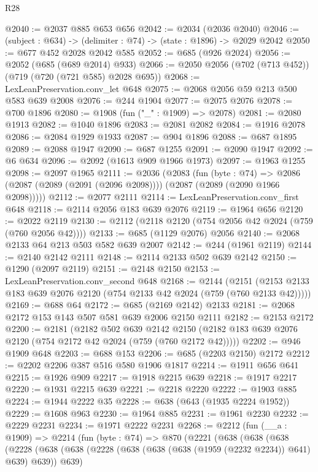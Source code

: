 \begin{lexlean}{R28}
\begin{coremodule}
@2040 := @2037 @885 @653 @656
@2042 := @2034 (@2036 @2040)
@2046 := (subject : @634) -> (delimiter : @74) -> (state : @1896) -> @2029 @2042
@2050 := @677 @452 @2028 @2042 @585
@2052 := @685 (@926 @2024)
@2056 := @2052 (@685 (@689 @2014) @933)
@2066 := @2050 @2056 (@702 (@713 @452)) (@719 (@720 (@721 @585) @2028 @695))
@2068 := LexLeanPreservation.conv_let @648
@2075 := @2068 @2056 @59 @213 @500 @583 @639 @2008
@2076 := @244 @1904
@2077 := @2075 @2076
@2078 := @700 @1896
@2080 := @1908 (fun ("_" : @1909) => @2078)
@2081 := @2080 @1913
@2082 := @1040 @1896
@2083 := @2081 @2082
@2084 := @1916 @2078
@2086 := @2084 @1929 @1933
@2087 := @904 @1896
@2088 := @687 @1895
@2089 := @2088 @1947
@2090 := @687 @1255
@2091 := @2090 @1947
@2092 := @6 @634
@2096 := @2092 (@1613 @909 @1966 @1973)
@2097 := @1963 @1255
@2098 := @2097 @1965
@2111 := @2036
    (@2083
      (fun (byte : @74) =>
      @2086 (@2087 (@2089 (@2091 (@2096 @2098)))) (@2087 (@2089 (@2090 @1966 @2098)))))
@2112 := @2077 @2111
@2114 := LexLeanPreservation.conv_first @648
@2118 := @2114 @2056 @183 @639 @2076
@2119 := @1964 @656
@2120 := @2022 @2119
@2130 := @2112 (@2118 @2120 (@754 @2056 @42 @2024 (@759 (@760 @2056 @42))))
@2133 := @685 (@1129 @2076) @2056
@2140 := @2068 @2133 @64 @213 @503 @582 @639 @2007
@2142 := @244 (@1961 @2119)
@2144 := @2140 @2142 @2111
@2148 := @2114 @2133 @502 @639 @2142
@2150 := @1290 (@2097 @2119)
@2151 := @2148 @2150
@2153 := LexLeanPreservation.conv_second @648
@2168 := @2144
    (@2151 (@2153 @2133 @183 @639 @2076 @2120 (@754 @2133 @42 @2024 (@759 (@760 @2133 @42)))))
@2169 := @688 @64
@2172 := @685 (@2169 @2142) @2133
@2181 := @2068 @2172 @153 @143 @507 @581 @639 @2006 @2150 @2111
@2182 := @2153 @2172
@2200 := @2181
    (@2182
      @502
      @639
      @2142
      @2150
      (@2182 @183 @639 @2076 @2120 (@754 @2172 @42 @2024 (@759 (@760 @2172 @42)))))
@2202 := @946 @1909 @648
@2203 := @688 @153
@2206 := @685 (@2203 @2150) @2172
@2212 := @2202 @2206 @387 @516 @580 @1906 @1817
@2214 := @1911 @656 @641
@2215 := @1926 @909
@2217 := @1918 @2215 @639
@2218 := @1917 @2217
@2220 := @1931 @2215 @639
@2221 := @2218 @2220
@2222 := @1903 @885
@2224 := @1944 @2222 @35
@2228 := @638 (@643 (@1935 @2224 @1952))
@2229 := @1608 @963
@2230 := @1964 @885
@2231 := @1961 @2230
@2232 := @2229 @2231
@2234 := @1971 @2222 @2231
@2268 := @2212
    (fun (__a : @1909) =>
    @2214
      (fun (byte : @74) =>
      @870
        (@2221
          (@638
            (@638
              (@638
                (@2228
                  (@638
                    (@638 (@2228 (@638 (@638 (@638 (@1959 (@2232 @2234)) @641) @639) @639)) @639)

\end{coremodule}
\end{lexlean}
